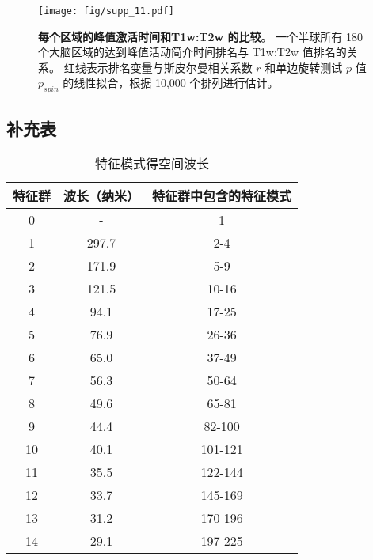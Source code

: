 \documentclass[lang=cn,a4paper,newtx,citestyle=gb7714-2015, bibstyle=gb7714-2015]{elegantpaper}
\begin{document}
\begin{figure}[!htb] 
	\centering
	\texttt{[image: fig/supp\_11.pdf]}
	\caption{
		\textbf{每个区域的峰值激活时间和T1w:T2w 的比较}。
		一个半球所有 180 个大脑区域的达到峰值活动简介时间排名与 T1w:T2w 值排名的关系。
		红线表示排名变量与斯皮尔曼相关系数 $ r $ 和单边旋转测试 $ p $ 值 $ p_{spin} $ 的线性拟合，根据 10,000 个排列进行估计。
	} \label{fig:supp_11}
\end{figure}



\subsection{补充表}

\begin{table}[htbp]
	\centering
	\small
	\caption{特征模式得空间波长}
	\begin{tabular}{ccc}
		\toprule
		特征群         &        波长（纳米）  & 特征群中包含的特征模式     \\
		\midrule
		0      &   -      &      1  \\
		1      &   297.7      &      2-4  \\
		2      &   171.9      &      5-9  \\
		3      &   121.5      &      10-16  \\
		4      &   94.1      &      17-25  \\
		5      &   76.9      &      26-36  \\
		6      &   65.0      &      37-49  \\
		7      &   56.3      &      50-64  \\
		8      &   49.6      &      65-81  \\
		9      &   44.4      &      82-100  \\
		10      &   40.1      &      101-121  \\
		11      &   35.5      &      122-144  \\
		12      &   33.7      &      145-169  \\
		13      &   31.2      &      170-196  \\
		14      &   29.1      &      197-225  \\

		\bottomrule
	\end{tabular}%
	\label{tab:spatial_wavelength}%
\end{table}%
\end{document}
